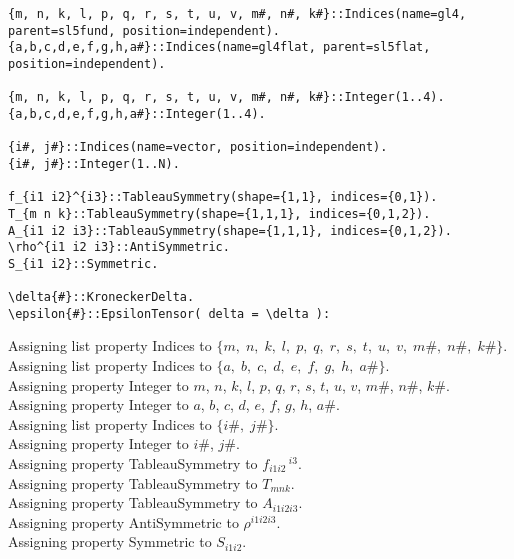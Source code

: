\documentclass[11pt]{article}
\begin{document}
{\color[named]{Blue}\begin{verbatim}
{m, n, k, l, p, q, r, s, t, u, v, m#, n#, k#}::Indices(name=gl4, parent=sl5fund, position=independent).
{a,b,c,d,e,f,g,h,a#}::Indices(name=gl4flat, parent=sl5flat, position=independent).

{m, n, k, l, p, q, r, s, t, u, v, m#, n#, k#}::Integer(1..4).
{a,b,c,d,e,f,g,h,a#}::Integer(1..4).

{i#, j#}::Indices(name=vector, position=independent).
{i#, j#}::Integer(1..N).

f_{i1 i2}^{i3}::TableauSymmetry(shape={1,1}, indices={0,1}).
T_{m n k}::TableauSymmetry(shape={1,1,1}, indices={0,1,2}).
A_{i1 i2 i3}::TableauSymmetry(shape={1,1,1}, indices={0,1,2}).
\rho^{i1 i2 i3}::AntiSymmetric.
S_{i1 i2}::Symmetric.

\delta{#}::KroneckerDelta.
\epsilon{#}::EpsilonTensor( delta = \delta ):
\end{verbatim}}
Assigning list property Indices to $\{m,\; n,\; k,\; l,\; p,\; q,\; r,\; s,\; t,\; u,\; v,\; m\#,\; n\#,\; k\#\}$.
\\
Assigning list property Indices to $\{a,\; b,\; c,\; d,\; e,\; f,\; g,\; h,\; a\#\}$.
\\
Assigning property Integer to $m$, $n$, $k$, $l$, $p$, $q$, $r$, $s$, $t$, $u$, $v$, $m\#$, $n\#$, $k\#$.
\\
Assigning property Integer to $a$, $b$, $c$, $d$, $e$, $f$, $g$, $h$, $a\#$.
\\
Assigning list property Indices to $\{i\#,\; j\#\}$.
\\
Assigning property Integer to $i\#$, $j\#$.
\\
Assigning property TableauSymmetry to ${f}_{i1 i2}\,^{i3}$.
\\
Assigning property TableauSymmetry to ${T}_{m n k}$.
\\
Assigning property TableauSymmetry to ${A}_{i1 i2 i3}$.
\\
Assigning property AntiSymmetric to ${\rho}^{i1 i2 i3}$.
\\
Assigning property Symmetric to ${S}_{i1 i2}$.
\\
\end{document}
